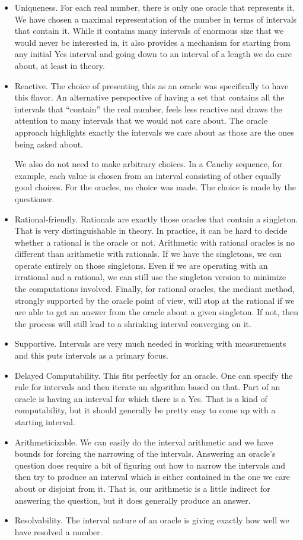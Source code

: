 \documentclass[12pt]{article}
\begin{document}
\begin{itemize}
    \item Uniqueness. For each real number, there is only one oracle that represents it. We have chosen a maximal representation of the number in terms of intervals that contain it. While it contains many intervals of enormous size that we would never be interested in, it also provides a mechanism for starting from any initial Yes interval and going down to an interval of a length we do care about, at least in theory. 
    \item Reactive. The choice of presenting this as an oracle was specifically to have this flavor. An alternative perspective of having a set that contains all the intervals that ``contain'' the real number, feels less reactive and draws the attention to many intervals that we would not care about. The oracle approach highlights exactly the intervals we care about as those are the ones being asked about. 
    
    We also do not need to make arbitrary choices. In a Cauchy sequence, for example, each value is chosen from an interval consisting of other equally good choices. For the oracles, no choice was made. The choice is made by the questioner. 
    \item Rational-friendly. Rationals are exactly those oracles that contain a singleton. That is very distinguishable in theory. In practice, it can be hard to decide whether a rational is the oracle or not. Arithmetic with rational oracles is no different than arithmetic with rationals. If we have the singletons, we can operate entirely on those singletons. Even if we are operating with an irrational and a rational, we can still use the singleton version to minimize the computations involved. Finally, for rational oracles, the mediant method, strongly supported by the oracle point of view, will stop at the rational if we are able to get an answer from the oracle about a given singleton. If not, then the process will still lead to a shrinking interval converging on it.
    \item Supportive. Intervals are very much needed in working with measurements and this puts intervals as a primary focus. 
    \item Delayed Computability. This fits perfectly for an oracle. One can specify the rule for intervals and then iterate an algorithm based on that. Part of an oracle is having an interval for which there is a Yes. That is a kind of computability, but it should generally be pretty easy to come up with a starting interval. 
    \item Arithmeticizable. We can easily do the interval arithmetic and we have bounds for forcing the narrowing of the intervals. Answering an oracle's question does require a bit of figuring out how to narrow the intervals and then try to produce an interval which is either contained in the one we care about or disjoint from it. That is, our arithmetic is a little indirect for answering the question, but it does generally produce an answer. 
    \item Resolvability. The interval nature of an oracle is giving exactly how well we have resolved a number. 
\end{itemize}
\end{document}

